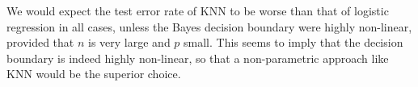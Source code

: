 We would expect the test error rate of KNN to be worse than that of logistic
regression in all cases, unless the Bayes decision boundary were highly
non-linear, provided that $n$ is very large and $p$ small. This seems to imply
that the decision boundary is indeed highly non-linear, so that a
non-parametric approach like KNN would be the superior choice.
